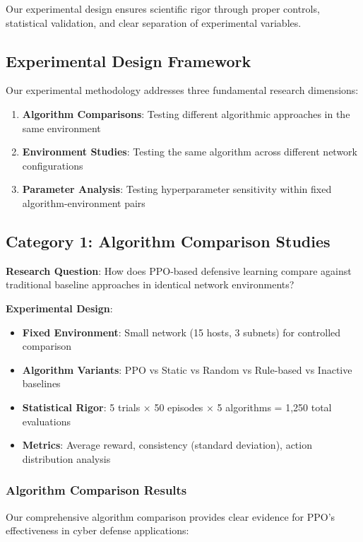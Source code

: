 \documentclass[12pt,twoside]{article}
\begin{document}
Our experimental design ensures scientific rigor through proper controls, statistical validation, and clear separation of experimental variables.

\subsection{Experimental Design Framework}

Our experimental methodology addresses three fundamental research dimensions:

\begin{enumerate}
\item \textbf{Algorithm Comparisons}: Testing different algorithmic approaches in the same environment
\item \textbf{Environment Studies}: Testing the same algorithm across different network configurations  
\item \textbf{Parameter Analysis}: Testing hyperparameter sensitivity within fixed algorithm-environment pairs
\end{enumerate}

\subsection{Category 1: Algorithm Comparison Studies}

\textbf{Research Question}: How does PPO-based defensive learning compare against traditional baseline approaches in identical network environments?

\textbf{Experimental Design}:
\begin{itemize}
\item \textbf{Fixed Environment}: Small network (15 hosts, 3 subnets) for controlled comparison
\item \textbf{Algorithm Variants}: PPO vs Static vs Random vs Rule-based vs Inactive baselines
\item \textbf{Statistical Rigor}: 5 trials × 50 episodes × 5 algorithms = 1,250 total evaluations
\item \textbf{Metrics}: Average reward, consistency (standard deviation), action distribution analysis
\end{itemize}

\subsubsection{Algorithm Comparison Results}

Our comprehensive algorithm comparison provides clear evidence for PPO's effectiveness in cyber defense applications:
\end{document}
